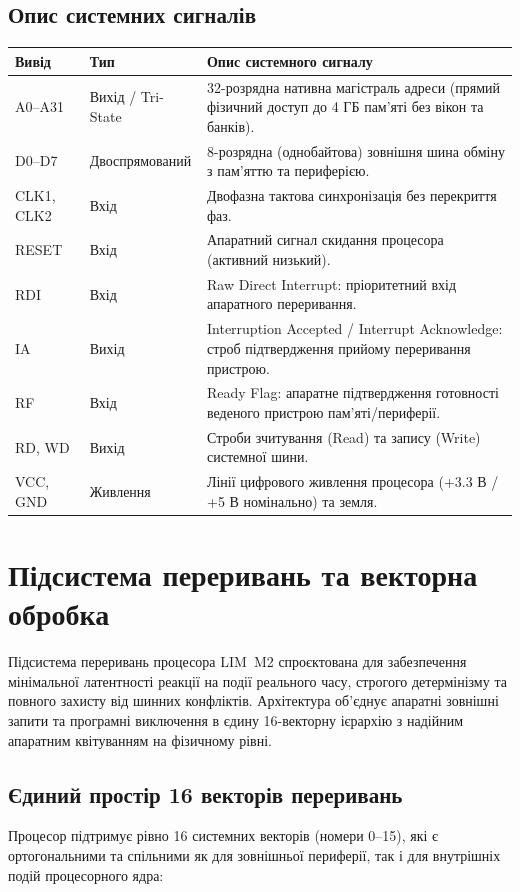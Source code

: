 \documentclass[11pt,a4paper]{article}
\begin{document}
\subsection{Опис системних сигналів}
\begin{tabularx}{\textwidth}{>{\ttfamily}p{28mm}p{24mm}X}
\toprule
Вивід & Тип & Опис системного сигналу \\
\midrule
A0--A31    & Вихід / Tri-State & 32-розрядна нативна магістраль адреси (прямий фізичний доступ до 4 ГБ пам'яті без вікон та банків). \\
D0--D7     & Двоспрямований    & 8-розрядна (однобайтова) зовнішня шина обміну з пам'яттю та периферією. \\
CLK1, CLK2 & Вхід              & Двофазна тактова синхронізація без перекриття фаз. \\
RESET      & Вхід              & Апаратний сигнал скидання процесора (активний низький). \\
RDI        & Вхід              & Raw Direct Interrupt: пріоритетний вхід апаратного переривання. \\
IA         & Вихід             & Interruption Accepted / Interrupt Acknowledge: строб підтвердження прийому переривання пристрою. \\
RF         & Вхід              & Ready Flag: апаратне підтвердження готовності веденого пристрою пам'яті/периферії. \\
RD, WD     & Вихід             & Строби зчитування (Read) та запису (Write) системної шини. \\
VCC, GND   & Живлення          & Лінії цифрового живлення процесора (+3.3 В / +5 В номінально) та земля. \\
\bottomrule
\end{tabularx}

\clearpage
\section{Підсистема переривань та векторна обробка}

Підсистема переривань процесора LIM~M2 спроєктована для забезпечення мінімальної латентності реакції на події реального часу, строгого детермінізму та повного захисту від шинних конфліктів. Архітектура об'єднує апаратні зовнішні запити та програмні виключення в єдину 16-векторну ієрархію з надійним апаратним квітуванням на фізичному рівні.

\subsection{Єдиний простір 16 векторів переривань}
Процесор підтримує рівно 16 системних векторів (номери 0--15), які є ортогональними та спільними як для зовнішньої периферії, так і для внутрішніх подій процесорного ядра:
\end{document}
